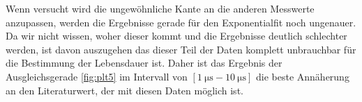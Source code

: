 Wenn versucht wird die ungewöhnliche Kante an die anderen Messwerte anzupassen, werden die Ergebnisse gerade für den Exponentialfit noch ungenauer. 
Da wir nicht wissen, woher dieser kommt und die Ergebnisse deutlich schlechter werden, 
ist davon auszugehen das dieser Teil der Daten komplett unbrauchbar für die Bestimmung der Lebensdauer ist.
Daher ist das Ergebnis der Ausgleichsgerade \eqref{fig:plt5} im Intervall von $[\qty{1}{\us}-\qty{10}{\us}]$ die beste Annäherung an den Literaturwert, der mit diesen Daten möglich ist. 

\newpage
\printbibliography

